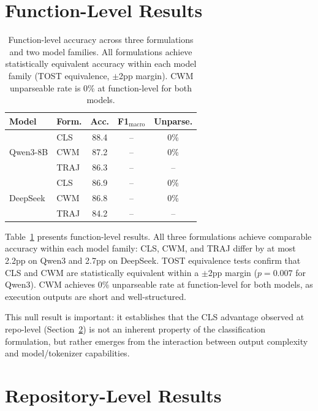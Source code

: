 \documentclass[11pt]{article}
\begin{document}
\section{Function-Level Results}
\label{sec:func}

\begin{table}[t]
\centering
\small
\begin{tabular}{llccc}
\toprule
\textbf{Model} & \textbf{Form.} & \textbf{Acc.} & \textbf{F1$_\text{macro}$} & \textbf{Unparse.} \\
\midrule
\multirow{3}{*}{Qwen3-8B} & CLS  & 88.4 & -- & 0\% \\
                           & CWM  & 87.2 & -- & 0\% \\
                           & TRAJ & 86.3 & -- & -- \\
\midrule
\multirow{3}{*}{DeepSeek}  & CLS  & 86.9 & -- & 0\% \\
                           & CWM  & 86.8 & -- & 0\% \\
                           & TRAJ & 84.2 & -- & -- \\
\bottomrule
\end{tabular}
\caption{Function-level accuracy across three formulations and two model families. All formulations achieve statistically equivalent accuracy within each model family (TOST equivalence, $\pm$2pp margin). CWM unparseable rate is 0\% at function-level for both models.}
\label{tab:func_results}
\end{table}

Table~\ref{tab:func_results} presents function-level results. All three formulations achieve comparable accuracy within each model family: CLS, CWM, and TRAJ differ by at most 2.2pp on Qwen3 and 2.7pp on DeepSeek. TOST equivalence tests confirm that CLS and CWM are statistically equivalent within a $\pm$2pp margin ($p{=}0.007$ for Qwen3). CWM achieves 0\% unparseable rate at function-level for both models, as execution outputs are short and well-structured.

This null result is important: it establishes that the CLS advantage observed at repo-level (Section~\ref{sec:repo}) is not an inherent property of the classification formulation, but rather emerges from the interaction between output complexity and model/tokenizer capabilities.

\section{Repository-Level Results}
\label{sec:repo}
\end{document}
